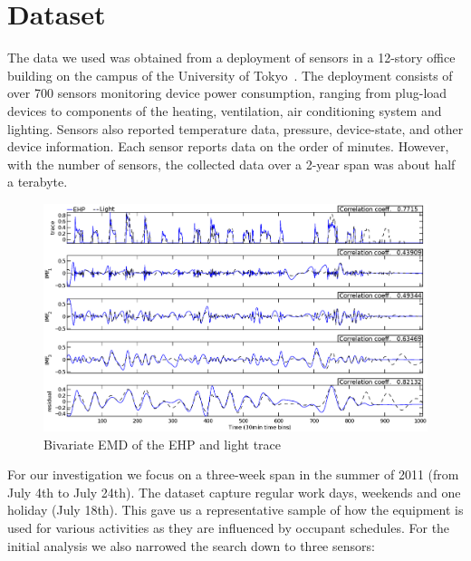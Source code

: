 \section{Dataset}
The data we used was obtained from a deployment of sensors in a 12-story office building
on the campus of the University of Tokyo~\cite{gutp, ogawa:lncs2011}.  The deployment consists of 
over 700 sensors monitoring device power consumption, ranging from plug-load devices to components of the
heating, ventilation, air conditioning system and lighting.  Sensors also reported temperature
data, pressure, device-state, and other device information.  Each sensor reports data on the
order of minutes.  However, with the number of sensors, the collected data over a 2-year
span was about half a terabyte.


\begin{figure}[tb]
\hspace{-2cm}
\includegraphics[width=1.2\textwidth]{img/emd_25_26.eps}
\vspace{-1cm}
\caption{Bivariate EMD of the EHP and light trace}
\label{fig:emd}
\end{figure}



For our investigation we focus on a three-week span in the summer of 2011 (from July 4th to July 24th).
The dataset capture regular work days, weekends and one holiday (July 18th).  This gave us a representative sample
of how the equipment is used for various activities as they are influenced by occupant schedules.  For the initial
analysis we also narrowed the search down to three sensors:

